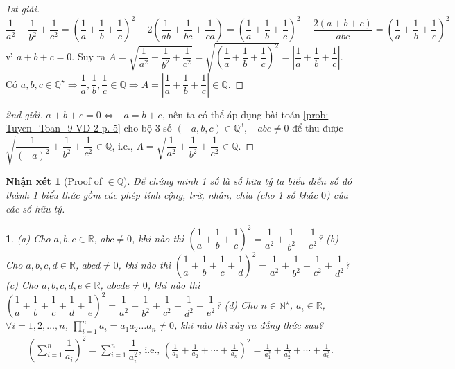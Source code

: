 \documentclass{article}
\newtheorem{baitoan}{}
\newtheorem{nhanxet}{Nhận xét}
\begin{document}
\begin{proof}[1st giải]
	$\dfrac{1}{a^2} + \dfrac{1}{b^2} + \dfrac{1}{c^2} = \left(\dfrac{1}{a} + \dfrac{1}{b} + \dfrac{1}{c}\right)^2 - 2\left(\dfrac{1}{ab} + \dfrac{1}{bc} + \dfrac{1}{ca}\right) = \left(\dfrac{1}{a} + \dfrac{1}{b} + \dfrac{1}{c}\right)^2 - \dfrac{2(a + b + c)}{abc} = \left(\dfrac{1}{a} + \dfrac{1}{b} + \dfrac{1}{c}\right)^2$ vì $a + b + c = 0$. Suy ra $A = \sqrt{\dfrac{1}{a^2} + \dfrac{1}{b^2} + \dfrac{1}{c^2}} = \sqrt{\left(\dfrac{1}{a} + \dfrac{1}{b} + \dfrac{1}{c}\right)^2} = \left|\dfrac{1}{a} + \dfrac{1}{b} + \dfrac{1}{c}\right|$. Có $a,b,c\in\mathbb{Q}^\star\Rightarrow\dfrac{1}{a},\dfrac{1}{b},\dfrac{1}{c}\in\mathbb{Q}\Rightarrow A =\left|\dfrac{1}{a} + \dfrac{1}{b} + \dfrac{1}{c}\right|\in\mathbb{Q}$.
\end{proof}

\begin{proof}[2nd giải]
	$a + b + c = 0\Leftrightarrow -a = b + c$, nên ta có thể áp dụng bài toán \ref{prob: Tuyen_Toan_9 VD 2 p. 5} cho bộ 3 số $(-a,b,c)\in\mathbb{Q}^3$, $-abc\ne0$ để thu được $\sqrt{\dfrac{1}{(-a)^2} + \dfrac{1}{b^2} + \dfrac{1}{c^2}}\in\mathbb{Q}$, i.e., $A = \sqrt{\dfrac{1}{a^2} + \dfrac{1}{b^2} + \dfrac{1}{c^2}}\in\mathbb{Q}$.
\end{proof}

\begin{nhanxet}[Proof of $\in\mathbb{Q}$]
	Để chứng minh 1 số là số hữu tỷ ta biểu diễn số đó thành 1 biểu thức gồm các phép tính cộng, trừ, nhân, chia (cho 1 số khác $0$) của các số hữu tỷ.
\end{nhanxet}

\begin{baitoan}
	(a) Cho $a,b,c\in\mathbb{R}$, $abc\ne0$, khi nào thì $\left(\dfrac{1}{a} + \dfrac{1}{b} + \dfrac{1}{c}\right)^2 = \dfrac{1}{a^2} + \dfrac{1}{b^2} + \dfrac{1}{c^2}$? (b) Cho $a,b,c,d\in\mathbb{R}$, $abcd\ne0$, khi nào thì $\left(\dfrac{1}{a} + \dfrac{1}{b} + \dfrac{1}{c} + \dfrac{1}{d}\right)^2 = \dfrac{1}{a^2} + \dfrac{1}{b^2} + \dfrac{1}{c^2} + \dfrac{1}{d^2}$? (c) Cho $a,b,c,d,e\in\mathbb{R}$, $abcde\ne0$, khi nào thì $\left(\dfrac{1}{a} + \dfrac{1}{b} + \dfrac{1}{c} + \dfrac{1}{d} + \dfrac{1}{e}\right)^2 = \dfrac{1}{a^2} + \dfrac{1}{b^2} + \dfrac{1}{c^2} + \dfrac{1}{d^2} + \dfrac{1}{e^2}$? (d) Cho $n\in\mathbb{N}^\star$, $a_i\in\mathbb{R}$, $\forall i = 1,2,\ldots,n$, $\prod_{i=1}^n a_i = a_1a_2\ldots a_n\ne0$, khi nào thì xảy ra đẳng thức sau?
	\begin{align*}
		\left(\sum_{i=1}^n \dfrac{1}{a_i}\right)^2 = \sum_{i=1}^n \dfrac{1}{a_i^2}\mbox{, i.e., } \left(\frac{1}{a_1} + \frac{1}{a_2} + \cdots + \frac{1}{a_n}\right)^2 = \frac{1}{a_1^2} + \frac{1}{a_2^2} + \cdots + \frac{1}{a_n^2}.
	\end{align*}
\end{baitoan}
\end{document}
